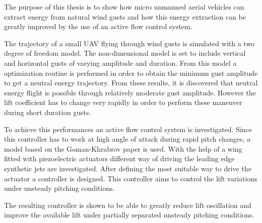 \par The purpose of this thesis is to show how micro unmanned aerial vehicles can extract energy
from natural wind gusts and how this energy extraction can be greatly improved by the use of
an active flow control system.

\par The trajectory of a small UAV flying through wind gusts is simulated with a two degree of freedom model.
The non-dimensional model is set to include vertical and horizontal gusts of varying amplitude and duration.
From this model a optimization routine is performed in order to obtain the minimum gust amplitude to get a neutral energy trajectory.
From these results, it is discovered that neutral energy flight is possible through relatively moderate gust amplitude.
However the lift coefficient has to change very rapidly in order to perform these maneuver during short duration gusts. 

\par To achieve this performances an active flow control system is investigated.
Since this controller has to work at high angle of attack during rapid pitch changes, a model based on the Goman-Khrabrov paper \cite{GK} is used.
With the help of a wing fitted with piezoelectric actuators different way of driving the leading edge synthetic jets are investigated.
After defining the most suitable way to drive the actuator a controller is designed. 
This controller aims to control the lift variations under unsteady pitching conditions.

\par The resulting controller is shown to be able to greatly reduce lift oscillation and improve the available lift under partially separated unsteady pitching conditions.

